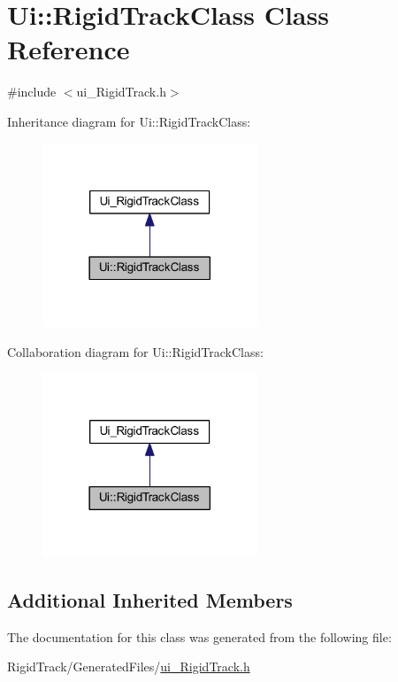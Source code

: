 \hypertarget{class_ui_1_1_rigid_track_class}{}\section{Ui\+:\+:Rigid\+Track\+Class Class Reference}
\label{class_ui_1_1_rigid_track_class}


{\ttfamily \#include $<$ui\+\_\+\+Rigid\+Track.\+h$>$}



Inheritance diagram for Ui\+:\+:Rigid\+Track\+Class\+:
\nopagebreak
\begin{figure}[H]
\begin{center}
\leavevmode
\includegraphics[width=182pt]{class_ui_1_1_rigid_track_class__inherit__graph}
\end{center}
\end{figure}


Collaboration diagram for Ui\+:\+:Rigid\+Track\+Class\+:
\nopagebreak
\begin{figure}[H]
\begin{center}
\leavevmode
\includegraphics[width=182pt]{class_ui_1_1_rigid_track_class__coll__graph}
\end{center}
\end{figure}
\subsection*{Additional Inherited Members}


The documentation for this class was generated from the following file\+:\begin{DoxyCompactItemize}
\item 
Rigid\+Track/\+Generated\+Files/\hyperlink{ui___rigid_track_8h}{ui\+\_\+\+Rigid\+Track.\+h}\end{DoxyCompactItemize}
